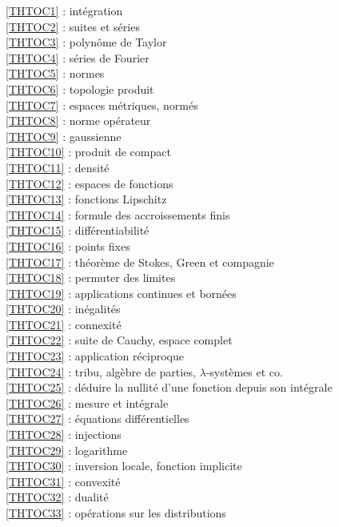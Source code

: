 \ref {THTOC1} : intégration\\
\ref {THTOC2} : suites et séries\\
\ref {THTOC3} : polynôme de Taylor\\
\ref {THTOC4} : séries de Fourier\\
\ref {THTOC5} : normes\\
\ref {THTOC6} : topologie produit\\
\ref {THTOC7} : espaces métriques, normés\\
\ref {THTOC8} : norme opérateur\\
\ref {THTOC9} : gaussienne\\
\ref {THTOC10} : produit de compact\\
\ref {THTOC11} : densité\\
\ref {THTOC12} : espaces de fonctions\\
\ref {THTOC13} : fonctions Lipschitz\\
\ref {THTOC14} : formule des accroissements finis\\
\ref {THTOC15} : différentiabilité\\
\ref {THTOC16} : points fixes\\
\ref {THTOC17} : théorème de Stokes, Green et compagnie\\
\ref {THTOC18} : permuter des limites\\
\ref {THTOC19} : applications continues et bornées\\
\ref {THTOC20} : inégalités\\
\ref {THTOC21} : connexité\\
\ref {THTOC22} : suite de Cauchy, espace complet\\
\ref {THTOC23} : application réciproque\\
\ref {THTOC24} : tribu, algèbre de parties, \( \lambda \)-systèmes et co.\\
\ref {THTOC25} : déduire la nullité d'une fonction depuis son intégrale\\
\ref {THTOC26} : mesure et intégrale\\
\ref {THTOC27} : équations différentielles\\
\ref {THTOC28} : injections\\
\ref {THTOC29} : logarithme\\
\ref {THTOC30} : inversion locale, fonction implicite\\
\ref {THTOC31} : convexité\\
\ref {THTOC32} : dualité\\
\ref {THTOC33} : opérations sur les distributions\\
